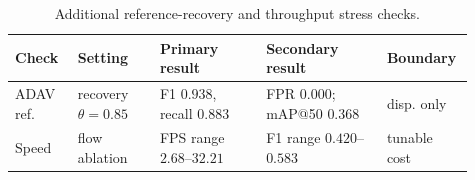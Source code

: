 \begin{table}[tbp]
\caption{Additional reference-recovery and throughput stress checks.}
\label{tab:stress_checks_auto}
\scriptsize
\setlength{\tabcolsep}{2.5pt}
\renewcommand{\arraystretch}{1.08}
\begin{tabular}{L{0.13\linewidth}L{0.17\linewidth}L{0.22\linewidth}L{0.25\linewidth}L{0.14\linewidth}}
\toprule
Check & Setting & Primary result & Secondary result & Boundary \\
\midrule
ADAV ref. & recovery $\theta=0.85$ & F1 $0.938$, recall $0.883$ & FPR $0.000$; mAP@50 $0.368$ & disp. only \\
Speed & flow ablation & FPS range $2.68$--$32.21$ & F1 range $0.420$--$0.583$ & tunable cost \\
\bottomrule
\end{tabular}
\end{table}

